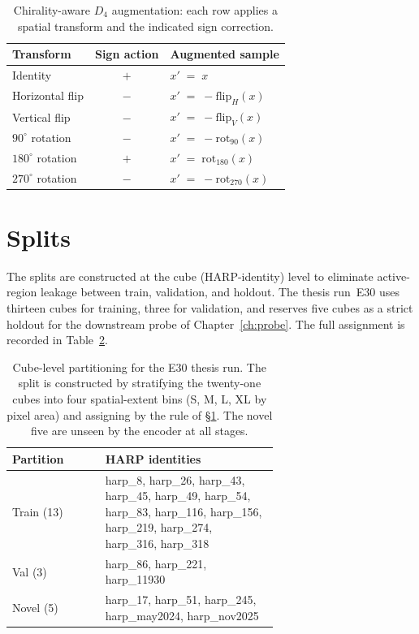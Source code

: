 \begin{table}[htbp]
\centering\small
\begin{tabular}{l c l}
\toprule
Transform & Sign action & Augmented sample \\
\midrule
Identity                 & $+$ & $x'\;=\;x$ \\
Horizontal flip          & $-$ & $x'\;=\;-\mathrm{flip}_{H}(x)$ \\
Vertical flip            & $-$ & $x'\;=\;-\mathrm{flip}_{V}(x)$ \\
$90^{\circ}$ rotation    & $-$ & $x'\;=\;-\mathrm{rot}_{90}(x)$ \\
$180^{\circ}$ rotation   & $+$ & $x'\;=\;\mathrm{rot}_{180}(x)$ \\
$270^{\circ}$ rotation   & $-$ & $x'\;=\;-\mathrm{rot}_{270}(x)$ \\
\bottomrule
\end{tabular}
\caption{Chirality-aware $D_{4}$ augmentation: each row applies a
spatial transform and the indicated sign correction.}
\label{tab:d4}
\end{table}

\section{Splits}
\label{sec:data-splits}

The splits are constructed at the cube (HARP-identity) level to
eliminate active-region leakage between train, validation, and
holdout. The thesis run~E30 uses thirteen cubes for training, three
for validation, and reserves five cubes as a strict holdout for the
downstream probe of Chapter~\ref{ch:probe}. The full assignment is
recorded in Table~\ref{tab:splits}.

\begin{table}[htbp]
\centering\small
\begin{tabular}{l p{0.65\linewidth}}
\toprule
Partition & HARP identities \\
\midrule
Train (13)    & harp\_8, harp\_26, harp\_43, harp\_45, harp\_49,
                harp\_54, harp\_83, harp\_116, harp\_156, harp\_219,
                harp\_274, harp\_316, harp\_318 \\
Val (3)       & harp\_86, harp\_221, harp\_11930 \\
Novel (5)     & harp\_17, harp\_51, harp\_245, harp\_may2024,
                harp\_nov2025 \\
\bottomrule
\end{tabular}
\caption{Cube-level partitioning for the E30 thesis run. The split
is constructed by stratifying the twenty-one cubes into four
spatial-extent bins (S, M, L, XL by pixel area) and assigning by
the rule of \S\ref{sec:data-splits}. The novel five are unseen by
the encoder at all stages.}
\label{tab:splits}
\end{table}

